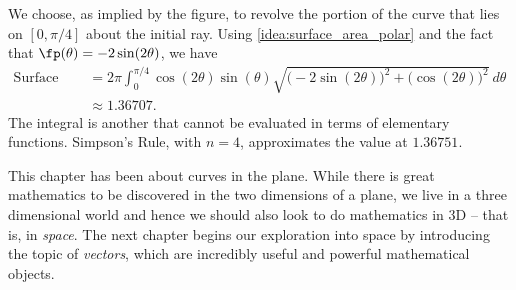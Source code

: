 {
We choose, as implied by the figure, to revolve the portion of the curve that lies on $[0,\pi/4]$ about the initial ray. Using \autoref{idea:surface_area_polar} and the fact that $\fp(\theta) = -2\sin(2\theta)$, we have
\begin{align*}
\text{Surface Area} &= 2\pi\int_0^{\pi/4} \cos(2\theta)\sin(\theta)\sqrt{\big(-2\sin(2\theta)\big)^2+\big(\cos(2\theta)\big)^2}\ d\theta \\
&\approx 1.36707.
\end{align*}
The integral is another that cannot be evaluated in terms of elementary functions. Simpson's Rule, with $n=4$, approximates the value at $1.36751$.%
}


This chapter has been about curves in the plane. While there is great mathematics to be discovered in the two dimensions of a plane, we live in a three dimensional world and hence we should also look to do mathematics in 3D -- that is, in \emph{space}. The next chapter begins our exploration into space by introducing the topic of \emph{vectors}, which are incredibly useful and powerful mathematical objects.

